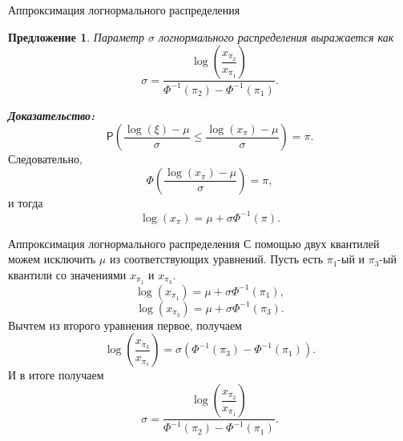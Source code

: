 \documentclass[ucs, notheorems, handout]{beamer}
\newtheorem{proposition}[theorem]{Предложение}
\begin{document}
\begin{frame}{Аппроксимация логнормального распределения}
	\begin{proposition}\label{pr3}
		Параметр $\sigma$ логнормального распределения выражается как
		\begin{equation*}
			\displaystyle{\sigma = \dfrac{\log\left(\dfrac{x_{\pi_{2}}}{x_{\pi_{1}}}\right)}{\Phi ^{-1}(\pi_{2}) - \Phi ^{-1}(\pi_{1})}}.
		\end{equation*} \label{13}
	\end{proposition}
\textbf{\textit{Доказательство:}}
\begin{equation*}
	\displaystyle{\mathsf{P}\left(\frac{\log(\xi)-\mu }{\sigma }\leq \frac{\log(x_{\pi})-\mu}{\sigma}\right) = \pi}.
\end{equation*}
Следовательно,
\begin{equation*}
	\displaystyle{\Phi \left(\frac{\log(x_{\pi})-\mu}{\sigma}\right)=\pi},
\end{equation*}
и тогда
\begin{equation*}
	\log(x_{\pi})=\mu + \sigma\Phi ^{-1}(\pi).
\end{equation*}

\end{frame}
\begin{frame}{Аппроксимация логнормального распределения}
	С помощью двух квантилей можем исключить $\mu$ из соответствующих уравнений. Пусть есть $\pi_{1}$-ый и $\pi_{3}$-ый квантили со значениями $x_{\pi_{1}}$ и $x_{\pi_{3}}$.
	\begin{equation*}
		\log(x_{\pi_{1}}) = \mu + \sigma\Phi ^{-1}(\pi_{1}),
	\end{equation*}
	\begin{equation*}
		\log(x_{\pi_{3}}) = \mu + \sigma\Phi ^{-1}(\pi_{3}).
	\end{equation*}
	Вычтем из второго уравнения первое, получаем
	\begin{equation*}
		\log\left(\frac{x_{\pi_{3}}}{x_{\pi_{1}}}\right) = \sigma(\Phi ^{-1}(\pi_{3})-\Phi ^{-1}(\pi_{1})).
	\end{equation*}
	И в итоге получаем
	\begin{equation*}
		\displaystyle{\sigma = \dfrac{\log\left(\dfrac{x_{\pi_{2}}}{x_{\pi_{1}}}\right)}{\Phi ^{-1}(\pi_{2}) - \Phi ^{-1}(\pi_{1})}}.
	\end{equation*}
	
\end{frame}
\end{document}

